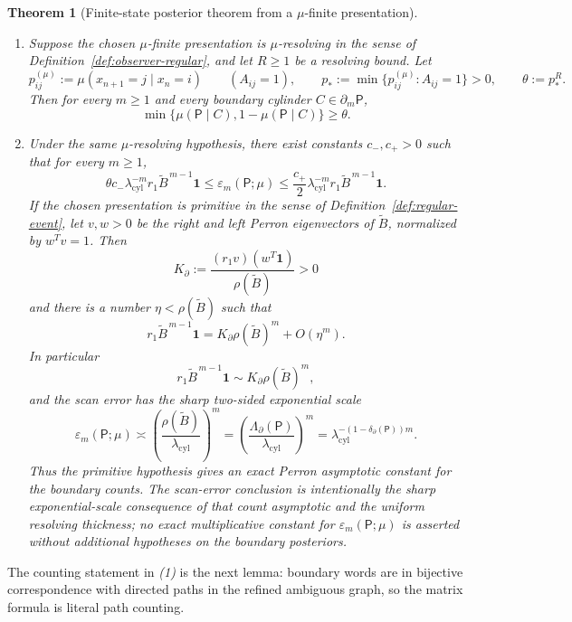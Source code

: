 \documentclass{etds}%
\numberwithin{equation}{section}
\theoremstyle{plain}
\newtheorem{theorem}{Theorem}[section]
\theoremstyle{definition}
\theoremstyle{remark}
\begin{document}
\begin{theorem}[Finite-state posterior theorem from a $\mu$-finite presentation]
\begin{enumerate}[label=(\arabic*)]
  normalized ambiguity exponent
  \[
  \delta_\partial(\mathsf{P})
  :=\frac{\log\Lambda_\partial(\mathsf{P})}{\log\lambda_{\mathrm{cyl}}}
  \]
  satisfies
  \[
  \delta_\partial(\mathsf{P})
  =\overline{\dim}_B(\partial\mathsf{P}).
  \]
\item Suppose the chosen $\mu$-finite presentation is $\mu$-resolving in the
  sense of Definition~\ref{def:observer-regular}, and let $R\ge 1$ be a
  resolving bound.  Let
\[
  p_{ij}^{(\mu)}:=\mu(x_{n+1}=j\mid x_n=i)\qquad(A_{ij}=1),
  \qquad
  p_*:=\min\{p_{ij}^{(\mu)}:A_{ij}=1\}>0,
  \qquad
  \theta:=p_*^R.
\]
  Then for every $m\ge 1$ and every boundary cylinder
  $C\in\partial_m\mathsf{P}$,
  \[
  \min\{\mu(\mathsf{P}\mid C),1-\mu(\mathsf{P}\mid C)\}\ge \theta.
  \]
\item Under the same $\mu$-resolving hypothesis, there exist constants
  $c_-,c_+>0$ such that for every $m\ge 1$,
  \[
  \theta c_-\lambda_{\mathrm{cyl}}^{-m}r_1\widetilde{B}^{\,m-1}\mathbf{1}
  \le \varepsilon_m(\mathsf{P};\mu)
  \le \frac{c_+}{2}\lambda_{\mathrm{cyl}}^{-m}r_1\widetilde{B}^{\,m-1}\mathbf{1}.
  \]
  If the chosen presentation is primitive in the sense of
  Definition~\ref{def:regular-event}, let $v,w>0$ be the right and left
  Perron eigenvectors of $\widetilde B$, normalized by $w^T v=1$.  Then
  \[
  K_\partial:=
  \frac{(r_1v)(w^T\mathbf{1})}{\rho(\widetilde B)}>0
  \]
  and there is a number $\eta<\rho(\widetilde B)$ such that
  \[
  r_1\widetilde{B}^{\,m-1}\mathbf{1}
  =K_\partial\rho(\widetilde{B})^m+O(\eta^m).
  \]
  In particular
  \[
  r_1\widetilde{B}^{\,m-1}\mathbf{1}
  \sim K_\partial\rho(\widetilde{B})^m,
  \]
  and the scan error has the sharp two-sided exponential scale
  \[
  \varepsilon_m(\mathsf{P};\mu)\asymp
  \left(\frac{\rho(\widetilde{B})}{\lambda_{\mathrm{cyl}}}\right)^m
  =\left(\frac{\Lambda_\partial(\mathsf{P})}{\lambda_{\mathrm{cyl}}}\right)^m
  =\lambda_{\mathrm{cyl}}^{-(1-\delta_\partial(\mathsf{P}))m}.
  \]
  Thus the primitive hypothesis gives an exact Perron asymptotic constant for
  the boundary counts.  The scan-error conclusion is intentionally the sharp
  exponential-scale consequence of that count asymptotic and the uniform
  resolving thickness; no exact multiplicative constant for
  $\varepsilon_m(\mathsf{P};\mu)$ is asserted without additional hypotheses on
  the boundary posteriors.
\end{enumerate}
\end{theorem}

The counting statement in \emph{(1)} is the next lemma: boundary words are in
bijective correspondence with directed paths in the refined ambiguous graph, so
the matrix formula is literal path counting.
\end{document}
